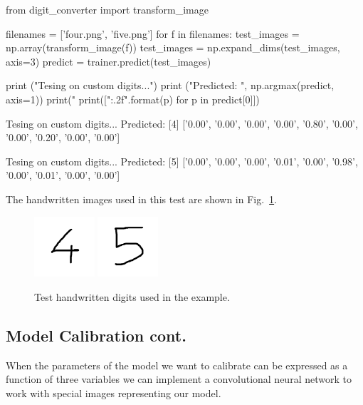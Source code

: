 \begin{ipython}
from digit_converter import transform_image

filenames = ['four.png', 'five.png']
for f in filenames:
    test_images = np.array(transform_image(f))
test_images = np.expand_dims(test_images, axis=3)
predict = trainer.predict(test_images)

print ("Tesing on custom digits...")
print ("Predicted: ", np.argmax(predict, axis=1))
print("%
print(["{:.2f}".format(p) for p in predict[0]])
\end{ipython}
\begin{ioutput}
Tesing on custom digits...
Predicted:  [4]
['0.00', '0.00', '0.00', '0.00', '0.80', '0.00', '0.00', '0.20', '0.00', '0.00']

Tesing on custom digits...
Predicted:  [5]
['0.00', '0.00', '0.00', '0.01', '0.00', '0.98', '0.00', '0.01', '0.00', '0.00']
\end{ioutput}
The handwritten images used in this test are shown in Fig.~\ref{fig:test_images}.

\begin{figure}[htb]
	\centering
	\includegraphics[width=0.2\textwidth]{figures/four.png}
	\includegraphics[width=0.2\textwidth]{figures/five.png}
	\caption{Test handwritten digits used in the example.}
	\label{fig:test_images}
\end{figure}

\subsection{Model Calibration cont.}\label{model-calibration-cont.}

When the parameters of the model we want to calibrate can be expressed
as a function of three variables we can implement a convolutional neural network to work with special images representing our model.

